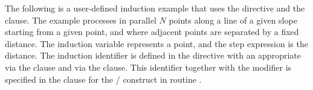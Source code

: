 The following is a user-defined induction example that uses the 
 directive and the  clause.
The example processes in parallel $N$ points along a line of a given slope 
starting from a given point, and where adjacent points are separated by 
a fixed distance. 
The induction variable  represents a point, and 
the step expression is the distance.  The induction identifier 
is defined in the  directive with an
appropriate  via the  clause and 
 via the  clause.
This identifier together with the  
modifier is specified in the  clause
for the / construct
in routine .



